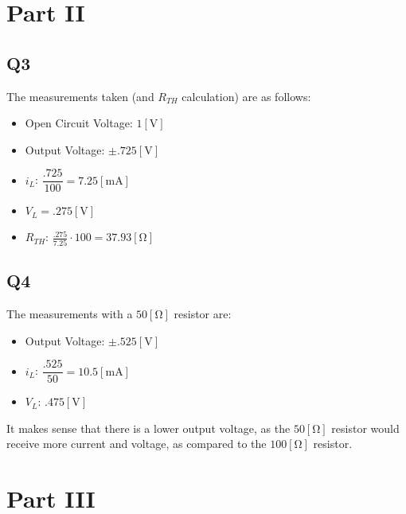\documentclass[
	letterpaper, %
	10pt, %
]{CSUniSchoolLabReport}
\begin{document}
\section{Part II} 

\subsection{Q3} The measurements taken (and $R_{TH}$ calculation) are as follows:

\vspace{10pt}

\begin{itemize}

  \item Open Circuit Voltage: $1[\si{\volt}]$

  \item Output Voltage: $\pm.725[\si{\volt}]$

  \item $i_L$: $\dfrac{.725}{100}=7.25[\si{\milli\ampere}]$

  \item $V_L=.275[\si{\volt}]$

  \item $R_{TH}$: $\frac{.275}{7.25}\cdot100=37.93[\si{\ohm}]$

\end{itemize}

\subsection{Q4} The measurements with a $50[\si{\ohm}]$ resistor are:

\begin{itemize}

  \item Output Voltage: $\pm.525[\si{\volt}]$

  \item $i_L$: $\dfrac{.525}{50}=10.5[\si{\milli\ampere}]$

  \item $V_L$: $.475[\si{\volt}]$

\end{itemize}

It makes sense that there is a lower output voltage, as the $50[\si{\ohm}]$ resistor would receive more current and voltage, as compared to the $100[\si{\ohm}]$ resistor.

\section{Part III}
\end{document}
